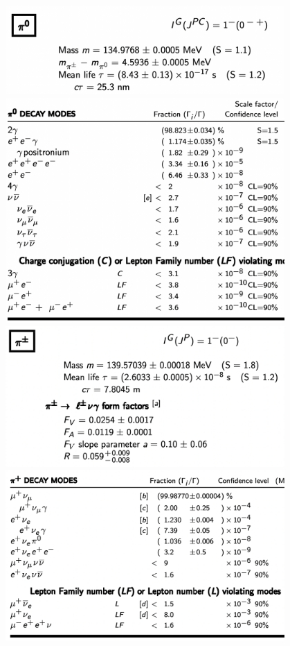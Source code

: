 \documentclass[txfonts]{NSTexam}
\begin{document}
\begin{questions}
\begin{center}
\includegraphics[width=0.8\textwidth]{PDG/PI_ZERO.png}
\includegraphics[width=0.8\textwidth]{PDG/PI_ZERO_DECAYS.png}
\clearpage
\includegraphics[width=0.8\textwidth]{PDG/PI_PLUS.png}
\includegraphics[width=0.8\textwidth]{PDG/PI_PLUS_DECAYS.png}

\end{center}
\end{questions}
\end{document}
